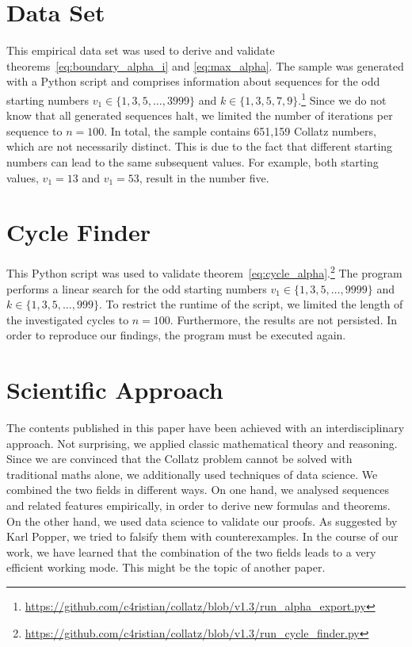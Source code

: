 \documentclass{SciPress_2015}
\begin{document}
\section{Data Set}
\label{appx:data_set}
This empirical data set was used to derive and validate theorems~\ref{eq:boundary_alpha_i} and \ref{eq:max_alpha}. The sample was generated with a Python script and comprises information about sequences for the odd starting numbers $v_1\in\{1,3,5,\ldots,3999\}$ and $k\in\{1,3,5,7,9\}$.\footnote{\url{https://github.com/c4ristian/collatz/blob/v1.3/run_alpha_export.py}} Since we do not know that all generated sequences halt, we limited the number of iterations per sequence to $n=100$. In total, the sample contains 651,159 Collatz numbers, which are not necessarily distinct. This is due to the fact that different starting numbers can lead to the same subsequent values. For example, both starting values, $v_1=13$ and $v_1=53$, result in the number five.

\section{Cycle Finder}
\label{appx:cycle_finder}
This Python script was used to validate theorem~\ref{eq:cycle_alpha}.\footnote{\url{https://github.com/c4ristian/collatz/blob/v1.3/run_cycle_finder.py}} The program performs a linear search for the odd starting numbers $v_1\in\{1,3,5,\ldots,9999\}$ and $k\in\{1,3,5,\ldots,999\}$. To restrict the runtime of the script, we limited the length of the investigated cycles to $n=100$. Furthermore, the results are not persisted. In order to reproduce our findings, the program must be executed again.

\section{Scientific Approach}
\label{appx:scientific_approach}
The contents published in this paper have been achieved with an interdisciplinary approach. Not surprising, we applied classic mathematical theory and reasoning. Since we are convinced that the Collatz problem cannot be solved with traditional maths alone, we additionally used techniques of data science. We combined the two fields in different ways. On one hand, we analysed sequences and related features empirically, in order to derive new formulas and theorems. On the other hand, we used data science to validate our proofs. As suggested by Karl Popper, we tried to falsify them with counterexamples. In the course of our work, we have learned that the combination of the two fields leads to a very efficient working mode. This might be the topic of another paper.
\end{document}
